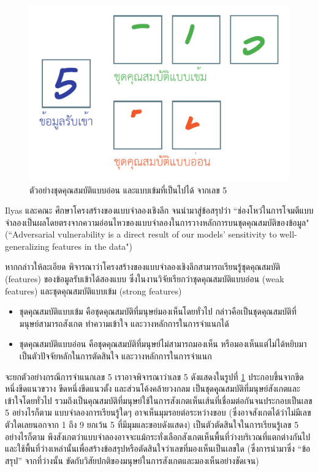 \documentclass{cpepaper}
\begin{document}
\begin{figure}
    \centering
    \includegraphics[width=\columnwidth]{images/strong-weak-features.pdf}
    \caption{ตัวอย่างชุดคุณสมบัติแบบอ่อน และแบบเข้มที่เป็นไปได้ จากเลข 5}
    \label{5-weak-strong}
\end{figure}

Ilyas และคณะ ศึกษาโครงสร้างของแบบจำลองเชิงลึก จนนำมาสู่ข้อสรุปว่า ``ช่องโหว่ในการโจมตีแบบจำลองเป็นผลโดยตรงจากความอ่อนไหวของแบบจำลองในการวางหลักการบนชุดคุณสมบัติของข้อมูล" (``Adversarial vulnerability is a direct result of our models’ sensitivity to well-generalizing features in the data")

หากกล่าวให้ละเอียด พิจารณาว่าโครงสร้างของแบบจำลองเชิงลึกสามารถเรียนรู้ชุดคุณสมบัติ (features) ของข้อมูลรับเข้าได้สองแบบ ซึ่งในงานวิจัยเรียกว่าชุดคุณสมบัติแบบอ่อน (weak features) และชุดคุณสมบัติแบบเข้ม (strong features)
\begin{itemize}
    \item ชุดคุณสมบัติแบบเข้ม คือชุดคุณสมบัติที่มนุษย์มองเห็นโดยทั่วไป กล่าวคือเป็นชุดคุณสมบัติที่มนุษย์สามารถสังเกต ทำความเข้าใจ และวางหลักการในการจำแนกได้
    \item ชุดคุณสมบัติแบบอ่อน คือชุดคุณสมบัติที่มนุษย์ไม่สามารถมองเห็น หรือมองเห็นแต่ไม่ได้หยิบมาเป็นตัวปัจจัยหลักในการตัดสินใจ และวางหลักการในการจำแนก
\end{itemize}

จะยกตัวอย่างกรณีการจำแนกเลข 5 เราอาจพิจารณาว่าเลข 5 ดังแสดงในรูปที่ \ref{5-weak-strong} ประกอบขึ้นจากขีดหนึ่งขีดแนวขวาง ขีดหนึ่งขีดแนวตั้ง และส่วนโค้งคล้ายวงกลม เป็นชุดคุุณสมบัติที่มนุษย์สังเกตและเข้าใจโดยทั่วไป รวมถึงเป็นคุณสมบัติที่มนุษย์ใช้ในการสังเกตเห็นเส้นที่เชื่อมต่อกันจนประกอบเป็นเลข 5 อย่างไรก็ตาม แบบจำลองการเรียนรู้ใดๆ อาจเห็นมุมรอยต่อระหว่างขอบ (ซึ่งอาจสังเกตได้ว่าไม่มีเลขตัวใดเลยนอกจาก 1 ถึง 9 ยกเว้น 5 ที่มีมุมและขอบดังแสดง) เป็นตัวตัดสินใจในการเรียนรู้เลข 5 อย่างไรก็ตาม พึงสังเกตว่าแบบจำลองอาจจะแม้กระทั่งเลือกสังเกตเห็นพื้นที่ว่างบริเวณที่แตกต่างกันไป และใช้พื้นที่ว่างเหล่านั้นเพื่อสร้างข้อสรุปหรือตัดสินใจว่าเลขที่มองเห็นเป็นเลขใด (ซึ่งการนำมาซึ่ง ``ข้อสรุป'' จากที่ว่างนั้น ขัดกับวิสัยปกติของมนุษย์ในการสังเกตและมองเห็นอย่างชัดเจน)
\end{document}
